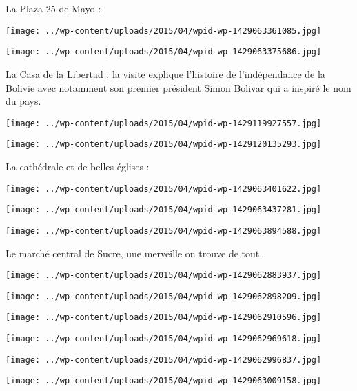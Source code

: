 \pagebreak
 La Plaza 25 de Mayo :
\begin{center} \texttt{[image: ../wp-content/uploads/2015/04/wpid-wp-1429063361085.jpg]} \end{center}
\begin{center} \texttt{[image: ../wp-content/uploads/2015/04/wpid-wp-1429063375686.jpg]} \end{center}
\vspace{-\topsep}
\vspace{-3.25mm}

\pagebreak
 La Casa de la Libertad : la visite explique l'histoire de l'indépendance de la Bolivie avec notamment son premier président Simon Bolivar qui a inspiré le nom du pays. 
\begin{center} \texttt{[image: ../wp-content/uploads/2015/04/wpid-wp-1429119927557.jpg]} \end{center}
\begin{center} \texttt{[image: ../wp-content/uploads/2015/04/wpid-wp-1429120135293.jpg]} \end{center}
\vspace{-\topsep}
\vspace{-2.25mm}

\pagebreak
 La cathédrale et de belles églises :
\begin{center} \texttt{[image: ../wp-content/uploads/2015/04/wpid-wp-1429063401622.jpg]} \end{center}
\begin{center} \texttt{[image: ../wp-content/uploads/2015/04/wpid-wp-1429063437281.jpg]} \end{center}
\begin{center} \texttt{[image: ../wp-content/uploads/2015/04/wpid-wp-1429063894588.jpg]} \end{center}

 Le marché central de Sucre, une merveille on trouve de tout. 
\begin{center} \texttt{[image: ../wp-content/uploads/2015/04/wpid-wp-1429062883937.jpg]} \end{center}
\begin{center} \texttt{[image: ../wp-content/uploads/2015/04/wpid-wp-1429062898209.jpg]} \end{center}
\begin{center} \texttt{[image: ../wp-content/uploads/2015/04/wpid-wp-1429062910596.jpg]} \end{center}
\begin{center} \texttt{[image: ../wp-content/uploads/2015/04/wpid-wp-1429062969618.jpg]} \end{center}
\begin{center} \texttt{[image: ../wp-content/uploads/2015/04/wpid-wp-1429062996837.jpg]} \end{center}
\begin{center} \texttt{[image: ../wp-content/uploads/2015/04/wpid-wp-1429063009158.jpg]} \end{center}

